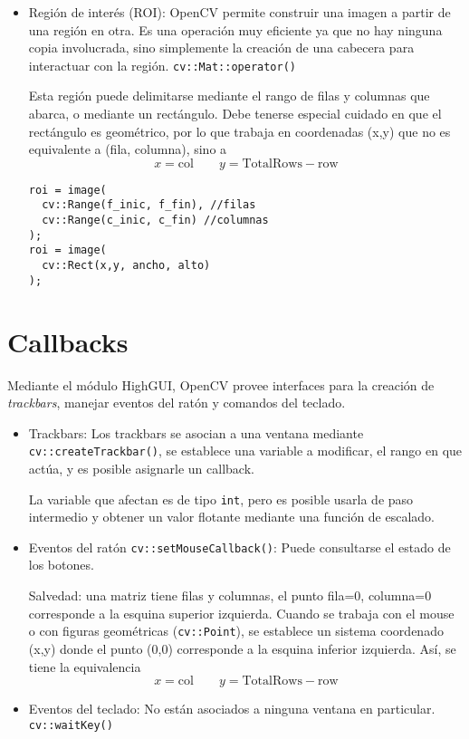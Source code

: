 \documentclass[oneside,a4paper]{book}
\begin{document}
\begin{itemize}
		\item Región de interés (ROI):
			OpenCV permite construir una imagen a partir de una región en otra.
			Es una operación muy eficiente ya que no hay ninguna copia involucrada,
			sino simplemente la creación de una cabecera para interactuar con la región.
			\verb|cv::Mat::operator()|

			Esta región puede delimitarse mediante el rango de filas y columnas que abarca,
			o mediante un rectángulo.
			Debe tenerse especial cuidado en que el rectángulo es geométrico,
			por lo que trabaja en coordenadas (x,y) que no es equivalente a (fila, columna), sino a
			\[
				x = \mathrm{col}\qquad
				y = \mathrm{TotalRows}-\mathrm{row}
			\]
			\begin{lstlisting}
roi = image(
  cv::Range(f_inic, f_fin), //filas
  cv::Range(c_inic, c_fin) //columnas
);
roi = image(
  cv::Rect(x,y, ancho, alto)
);
			\end{lstlisting}
	\end{itemize}

	\section{Callbacks}
		Mediante el módulo HighGUI, OpenCV provee interfaces para la creación de \emph{trackbars},
		manejar eventos del ratón y comandos del teclado.

		\begin{itemize}
			\item Trackbars:
			Los trackbars se asocian a una ventana mediante \verb|cv::createTrackbar()|,
			se establece una variable a modificar, el rango en que actúa, y es posible asignarle un callback.

			La variable que afectan es de tipo \verb|int|,
			pero es posible usarla de paso intermedio y obtener un valor flotante
			mediante una función de escalado.

		\item Eventos del ratón \verb|cv::setMouseCallback()|:
			Puede consultarse el estado de los botones.

			Salvedad: una matriz tiene filas y columnas,
			el punto fila=0, columna=0 corresponde a la esquina superior izquierda.
			Cuando se trabaja con el mouse o con figuras geométricas (\verb|cv::Point|),
			se establece un sistema coordenado (x,y) donde el punto (0,0) corresponde a la esquina inferior izquierda. Así, se tiene la equivalencia
			\[
				x = \mathrm{col}\qquad
				y = \mathrm{TotalRows}-\mathrm{row}
			\]

		\item Eventos del teclado:
			No están asociados a ninguna ventana en particular.
			\verb|cv::waitKey()|

		\end{itemize}
\end{document}
